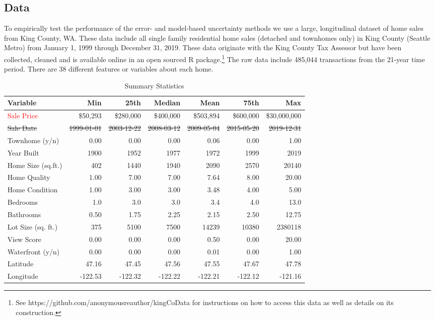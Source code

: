 \documentclass[colTwo]{anon}
\theoremstyle{definition}
\begin{document}
\subsection{Data}

To empirically test the performance of the error- and model-based uncertainty methods we use a large, longitudinal dataset of home sales from King County, WA.  These data include all single family residential home sales (detached and townhomes only) in King County (Seattle Metro) from January 1, 1999 through December 31, 2019. These data originate with the King County Tax Assessor but have been collected, cleaned and is available online in an open sourced R package.\footnote{See https://github.com/anonymousreauthor/kingCoData for instructions on how to access this data as well as details on its construction.} The raw data include 485,044 transactions from the 21-year time period.  There are 38 different features or variables about each home. 

\begin{table*}[h!]
\centering
{\color{red}
\begin{tabular}{l|r|r|r|r|r|r}
\hline
\textbf{Variable} & \textbf{Min} & \textbf{25th} & \textbf{Median} & \textbf{Mean} & \textbf{75th} & \textbf{Max}\\
\hline
\textcolor{red}{Sale Price} & \$50,293 & \$280,000 & \$400,000 & \$503,894 & \$600,000 & \$30,000,000\\
\st{Sale Date} & \st{1999-01-01} & \st{2003-12-22} & \st{2008-03-12} & \st{2009-05-04} & \st{2015-05-20} & \st{2019-12-31}\\
Townhome (y/n) & 0.00 & 0.00 & 0.00 & 0.06 & 0.00 & 1.00 \\
Year Built & 1900 & 1952 & 1977 & 1972 & 1999 & 2019\\
Home Size (sq.ft.) & 402 & 1440 & 1940 & 2090 & 2570 & 20140\\
Home Quality & 1.00 & 7.00 & 7.00 & 7.64 & 8.00 & 20.00\\
Home Condition & 1.00 & 3.00 & 3.00 & 3.48 & 4.00 & 5.00\\
Bedrooms & 1.0 & 3.0 & 3.0 & 3.4 & 4.0 & 13.0\\
Bathrooms & 0.50 & 1.75 & 2.25 & 2.15 & 2.50 & 12.75\\
Lot Size (sq. ft.) & 375 & 5100 & 7500 & 14239 & 10380 & 2380118\\
View Score & 0.00 & 0.00 & 0.00 & 0.50 & 0.00 & 20.00\\
Waterfront (y/n) & 0.00 & 0.00 & 0.00 & 0.01 & 0.00 & 1.00\\
Latitude & 47.16 & 47.45 & 47.56 & 47.55 & 47.67 & 47.78\\
Longitude & -122.53 & -122.32 & -122.22 & -122.21 & -122.12 & -121.16\\
\hline
\end{tabular}}
\caption{Summary Statistics}
\label{table:3}
\end{table*}
\end{document}
